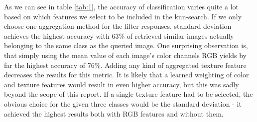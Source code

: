 As we can see in table \ref{tab:1}, the accuracy of classification varies quite a lot based on which features we select to be included in the knn-search. If we only choose one aggregation method for the filter responses, standard deviation achieves the highest accuracy with 63\% of retrieved similar images actually belonging to the same class as the queried image. One surprising observation is, that simply using the mean value of each image's color channels RGB yields by far the highest accuracy of 76\%. Adding any kind of aggregated texture feature decreases the results for this metric. It is likely that a learned weighting of color and texture features would result in even higher accuracy, but this was sadly beyond the scope of this report. If a single texture feature had to be selected, the obvious choice for the given three classes would be the standard deviation - it achieved the highest results both with RGB features and without them.
